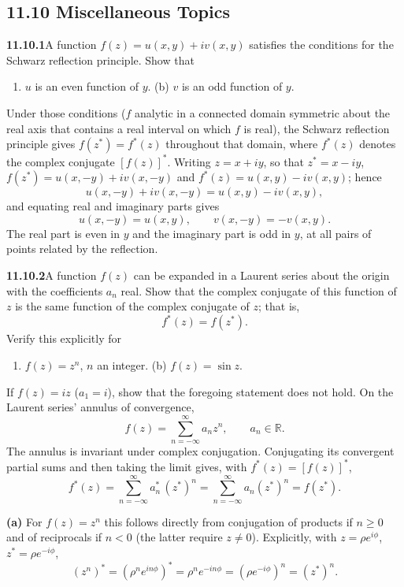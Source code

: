 \subsection*{11.10 Miscellaneous Topics}

\par\bigskip
\noindent\textbf{11.10.1}\quad A function $f(z)=u(x,y)+iv(x,y)$ satisfies the
conditions for the Schwarz reflection principle. Show that
\begin{enumerate}
\item[(a)] $u$ is an even function of $y$.\quad
(b) $v$ is an odd function of $y$.
\end{enumerate}
\solution
Under those conditions ($f$ analytic in a connected domain symmetric
about the real axis that contains a real interval on which $f$ is
real), the Schwarz reflection principle gives
$f(z^*)=f^*(z)$ throughout that domain, where $f^*(z)$ denotes the
complex conjugate $[f(z)]^*$.
Writing $z=x+iy$, so that $z^*=x-iy$,
$f(z^*)=u(x,-y)+iv(x,-y)$ and
$f^*(z)=u(x,y)-iv(x,y)$; hence
\[
u(x,-y)+iv(x,-y)=u(x,y)-iv(x,y),
\]
and equating real and imaginary parts gives
\[
\boxed{u(x,-y)=u(x,y)},\qquad
\boxed{v(x,-y)=-v(x,y)}.
\]
The real part is even in $y$ and the imaginary part is odd in $y$,
at all pairs of points related by the reflection.

\par\bigskip
\noindent\textbf{11.10.2}\quad A function $f(z)$ can be expanded in a Laurent
series about the origin with the coefficients $a_{n}$ real. Show that the
complex conjugate of this function of $z$ is the same function of the complex
conjugate of $z$; that is,
\[
f^{*}(z)=f(z^{*}).
\]
Verify this explicitly for
\begin{enumerate}
\item[(a)] $f(z)=z^{n}$, $n$ an integer.\quad
(b) $f(z)=\sin z$.
\end{enumerate}
If $f(z)=iz$ ($a_{1}=i$), show that the foregoing statement does not hold.
\solution
On the Laurent series' annulus of convergence,
\[
f(z)=\sum_{n=-\infty}^{\infty}a_nz^n,\qquad a_n\in\mathbb R.
\]
The annulus is invariant under complex conjugation. Conjugating its
convergent partial sums and then taking the limit gives, with
$f^*(z)=[f(z)]^*$,
\[
f^*(z)
=\sum_{n=-\infty}^{\infty}a_n^*\,(z^*)^n
=\sum_{n=-\infty}^{\infty}a_n(z^*)^n
=f(z^*).
\]

\textbf{(a)} For $f(z)=z^n$ this follows directly from conjugation
of products if $n\ge0$ and of reciprocals if $n<0$ (the latter
require $z\ne0$). Explicitly, with $z=\rho e^{i\phi}$,
$z^*=\rho e^{-i\phi}$,
\[
(z^n)^*=(\rho^ne^{in\phi})^*=\rho^ne^{-in\phi}
=(\rho e^{-i\phi})^n=(z^*)^n.
\]

